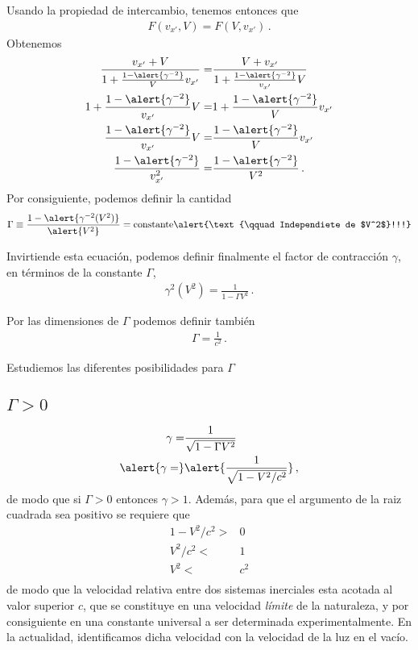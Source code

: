 \begin{frame}
Usando la propiedad de intercambio, tenemos entonces que
\begin{align*}
  F(v_{x'},V)=F(V,v_{x'})\,.
\end{align*}
Obtenemos %
\begin{align*}
\frac{v_{x'}+V}{1+\frac{1-\alert{\gamma^{-2}}}{V}v_{x'}}=&
\frac{V+v_{x'}}{1+\frac{1-\alert{\gamma^{-2}}}{v_{x'}}V}\nonumber\\
{1+\frac{1-\alert{\gamma^{-2}}}{v_{x'}}V}=&
{1+\frac{1-\alert{\gamma^{-2}}}{V}v_{x'}} \nonumber\\
{\frac{1-\alert{\gamma^{-2}}}{v_{x'}}V}=&
{\frac{1-\alert{\gamma^{-2}}}{V}v_{x'}} \nonumber\\
{\frac{1-\alert{\gamma^{-2}}}{v_{x'}^{2}}}=&
{\frac{1-\alert{\gamma^{-2}}}{V^2}}\,.
\end{align*}
Por consiguiente, podemos definir la cantidad 
\begin{align*}
  \Gamma\equiv\frac{1-\alert{\gamma^{-2}(V^2)}}{\alert{V^2}}=\text{constante} \alert{\text{\qquad Independiete de $V^2$}!!!}
\end{align*}

Invirtiende esta ecuación, podemos definir finalmente el factor de
contracción $\gamma$, en términos de la constante $\Gamma$,
\begin{align}
 \gamma^2(V^2)=\frac{1}{1-\Gamma V^2}\,.
\end{align}

Por las dimensiones de $\Gamma$ podemos definir también
\begin{align*}
  \Gamma=\frac{1}{c^2}\,.
\end{align*}

Estudiemos las diferentes posibilidades para $\Gamma$
\subsection{$\Gamma >0$}
\begin{align*}
  \gamma=&\frac{1}{\sqrt{1-\Gamma V^2}}\nonumber\\
  \alert{\gamma=}&\alert{\frac{1}{\sqrt{1-V^2/c^2}}}\,,
\end{align*}
de modo que si $\Gamma>0$ entonces $\gamma>1$. Además, para que el
argumento de la raiz cuadrada sea positivo se requiere que
\begin{align*}
  1-V^2/c^2>&0 \nonumber\\
  V^2/c^2<&1 \nonumber\\
  V^2<&c^2 \nonumber\\
\end{align*}
de modo que la velocidad relativa entre dos sistemas inerciales esta
acotada al valor superior $c$, que se constituye en una velocidad
\emph{límite} de la naturaleza, y por consiguiente en una constante
universal a ser determinada experimentalmente. En la actualidad,
identificamos dicha velocidad con la velocidad de la luz en el vacío.


\end{frame}
